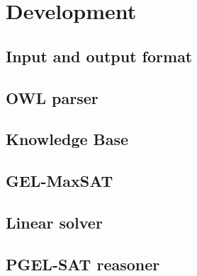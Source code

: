 
\chapter{Development}
\label{cap:development}
\section{Input and output format}

\section{OWL parser}

\section{Knowledge Base}

\section{GEL-MaxSAT}

\section{Linear solver}

\section{PGEL-SAT reasoner}
